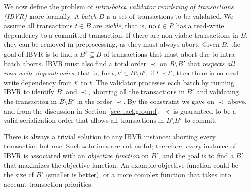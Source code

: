 We now define the problem of {\em intra-batch validator reordering of transactions (IBVR)} more formally. A \emph{batch} $B$ is a set of transactions to be validated. We assume all transactions $t \in B$ are \emph{viable}, that is, no $t \in B$ has a read-write dependency to a committed transaction. If there are non-viable transactions in $B$, they can be removed in preprocessing, as they must always abort.
Given $B$, the goal of IBVR is to find a $B' \subseteq B$ of transactions that must abort due to intra-batch aborts. IBVR must also find a 
total order $\prec$ on $B \setminus B'$ that \emph{respects all read-write dependencies}; that is, for $t,t'\in B \setminus B'$, if $t \prec t'$, then there is no read-write dependency from $t'$ to $t$.
The validator processes each batch by running IBVR to identify $B'$ and $\prec$, aborting all the transactions in $B'$  and validating the transaction in $B \setminus B'$  in the order $\prec$. By the constraint we gave on $\prec$ above, and from the discussion in Section~\ref{sec:background}, $\prec$ is guaranteed to be a valid serialization order that allows all transactions in $B \setminus B'$  to commit.



There is always a trivial solution to any IBVR instance: aborting every transaction but one. Such solutions are not useful; therefore, every instance of IBVR is associated with an \emph{objective function} on $B'$, and the goal is to find a $B'$ that maximizes the objective function. An example objective function could be the size of $B'$ (smaller is better), or a more complex function that takes into account transaction priorities.






